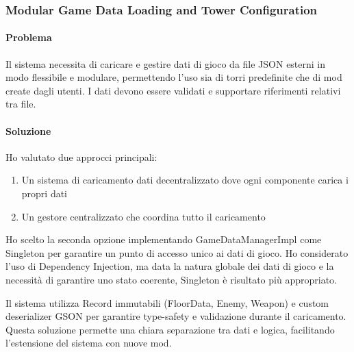 \documentclass[a4paper,12pt]{report}
\begin{document}
\subsubsection{Modular Game Data Loading and Tower Configuration}

\paragraph{Problema} Il sistema necessita di caricare e gestire dati di gioco da file JSON esterni in modo flessibile e modulare, permettendo l'uso sia di torri predefinite che di mod create dagli utenti. I dati devono essere validati e supportare riferimenti relativi tra file.

\paragraph{Soluzione} Ho valutato due approcci principali:
\begin{enumerate}
    \item Un sistema di caricamento dati decentralizzato dove ogni componente carica i propri dati
    \item Un gestore centralizzato che coordina tutto il caricamento
\end{enumerate}
Ho scelto la seconda opzione implementando GameDataManagerImpl come Singleton per garantire un punto di accesso unico ai dati di gioco. Ho considerato l'uso di Dependency Injection, ma data la natura globale dei dati di gioco e la necessità di garantire uno stato coerente, Singleton è risultato più appropriato.

Il sistema utilizza Record immutabili (FloorData, Enemy, Weapon) e custom deserializer GSON per garantire type-safety e validazione durante il caricamento. Questa soluzione permette una chiara separazione tra dati e logica, facilitando l'estensione del sistema con nuove mod.
\end{document}
